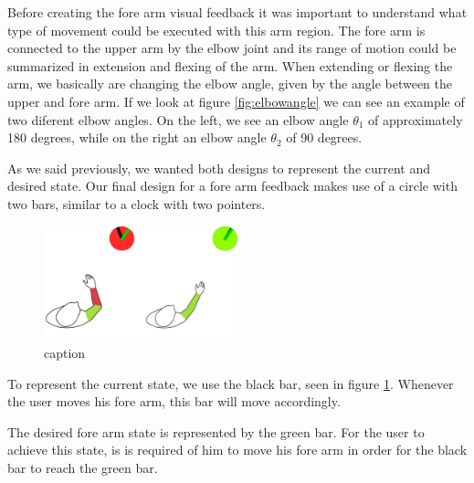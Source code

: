 Before creating the fore arm visual feedback it was important to understand what type of movement could be executed with this arm region.
The fore arm is connected to the upper arm by the elbow joint and its range of motion could be summarized in extension and flexing of the arm.
When extending or flexing the arm, we basically are changing the elbow angle, given by the angle between the upper and fore arm.
If we look at figure \ref{fig:elbowangle} we can see an example of two diferent elbow angles. On the left, we see an elbow angle $\theta$$_1$ of approximately 180 degrees, while on the right an elbow angle $\theta$$_2$ of 90 degrees.  

As we said previously, we wanted both designs to represent the current and desired state. Our final design for a fore arm feedback makes use of a circle with two bars, similar to a clock with two pointers.


\begin{figure}[!b]
    \begin{center}
        \includegraphics[width=0.5\textwidth]{imgs/forearmfeedback.png}
    \end{center}
    \caption{caption}
    \label{fig:forearmfeedback}
\end{figure}

To represent the current state, we use the black bar, seen in figure \ref{fig:forearmfeedback}. Whenever the user moves his fore arm, this bar will move accordingly.


The desired fore arm state is represented by the green bar. For the user to achieve this state, is is required of him to move his fore arm in order for the black bar to reach the green bar.

